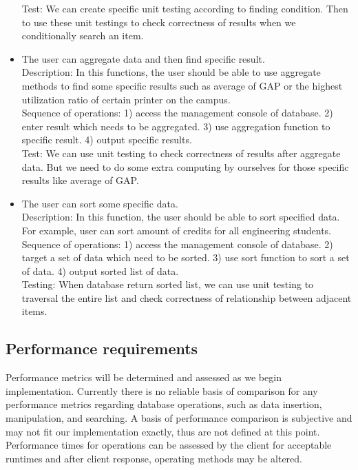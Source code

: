 \documentclass[10pt,draftclsnofoot,onecolumn,journal,compsoc]{IEEEtran}
\begin{document}
\begin{itemize}
        Test: We can create specific unit testing according to finding condition. Then to use these unit testings to check correctness of results when we conditionally search an item.
        \\
        \item The user can aggregate data and then find specific result.\\
        Description: In this functions, the user should be able to use aggregate methods to find some specific results such as average of GAP or the highest utilization ratio of certain printer on the campus.\\
        Sequence of operations: 1) access the management console of database. 2) enter result which needs to be aggregated. 3) use aggregation function to specific result. 4) output specific results.\\
        Test: We can use unit testing to check correctness of results after aggregate data. But we need to do some extra computing by ourselves for those specific results like average of GAP.
        \\
        \item The user can sort some specific data.\\
        Description: In this function, the user should be able to sort specified data. For example, user can sort amount of credits for all engineering students.\\
        Sequence of operations: 1) access the management console of database. 2) target a set of data which need to be sorted. 3) use sort function to sort a set of data. 4) output sorted list of data.\\
        Testing: When database return sorted list, we can use unit testing to traversal the entire list and check correctness of relationship between adjacent items.
        \end{itemize}

        \subsection{Performance requirements}
        Performance metrics will be determined and assessed as we begin implementation. Currently there is no reliable basis of comparison for any performance metrics regarding database operations, such as data insertion, manipulation, and searching. A basis of performance comparison is subjective and may not fit our implementation exactly, thus are not defined at this point. Performance times for operations can be assessed by the client for acceptable runtimes and after client response, operating methods may be altered.
        
\end{document}
